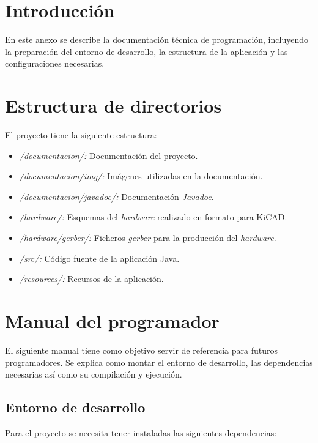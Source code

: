 
\section{Introducción}

En este anexo se describe la documentación técnica de programación, incluyendo la preparación del entorno de desarrollo, la estructura de la aplicación y las configuraciones necesarias.

\section{Estructura de directorios}

El proyecto tiene la siguiente estructura:

\begin{itemize}
\item
\textit{/documentacion/:} Documentación del proyecto.
\item
\textit{/documentacion/img/:} Imágenes utilizadas en la documentación.
\item
\textit{/documentacion/javadoc/:} Documentación \emph{Javadoc}.
\item
\textit{/hardware/:} Esquemas del \emph{hardware} realizado en formato para KiCAD.
\item
\textit{/hardware/gerber/:} Ficheros \emph{gerber} para la producción del \emph{hardware}.
\item
\textit{/src/:} Código fuente de la aplicación Java.
\item
\textit{/resources/:} Recursos de la aplicación.

\end{itemize}


\section{Manual del programador}

El siguiente manual tiene como objetivo servir de referencia para futuros programadores. Se explica como montar el entorno de desarrollo, las dependencias necesarias así como su compilación y ejecución.

\subsection{Entorno de desarrollo}

Para el proyecto se necesita tener instaladas las siguientes dependencias:

